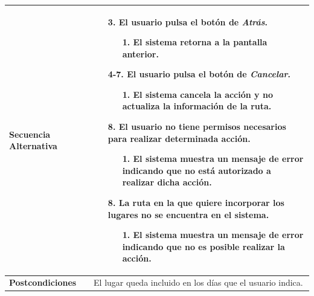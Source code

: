 \begin{longtable}{| p{4cm} | p{10cm} |}
\\
\hline
\textbf{Secuencia Alternativa} &\mbox{}\par\vspace{-\baselineskip}
\begin{enumerate}[leftmargin=0.9cm, topsep=0.1cm]
\item[3.] El usuario pulsa el botón de \textit{Atrás}.
	\begin{itemize}
	\item[1.] El sistema retorna a la pantalla anterior.
	\end{itemize}
\item[4-7.] El usuario pulsa el botón de \textit{Cancelar}.
	\begin{itemize}
	\item[1.] El sistema cancela la acción y no actualiza la información de la ruta.
	\end{itemize}
\item[8.] El usuario no tiene permisos necesarios para realizar determinada acción.
	\begin{itemize}
	\item[1.] El sistema muestra un mensaje de error indicando que no está autorizado a realizar dicha acción.
	\end{itemize}
\item[8.] La ruta en la que quiere incorporar los lugares no se encuentra en el sistema.
	\begin{itemize}
	\item[1.] El sistema muestra un mensaje de error indicando que no es posible realizar la acción.
	\end{itemize}
\end{enumerate}
\\

\hline
\textbf{Postcondiciones} & 
El lugar queda incluido en los días que el usuario indica.\\
\hline
\end{longtable}



\newpage
